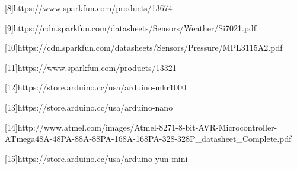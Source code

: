 \documentclass[IEEEtran,letterpaper,10pt,titlepage,fleqn,draftclsnofoot,onecolumn]{article}
\begin{document}
[8]https://www.sparkfun.com/products/13674

\vspace{1mm}

[9]https://cdn.sparkfun.com/datasheets/Sensors/Weather/Si7021.pdf

\vspace{1mm}

[10]https://cdn.sparkfun.com/datasheets/Sensors/Pressure/MPL3115A2.pdf

\vspace{1mm}

[11]https://www.sparkfun.com/products/13321

\vspace{1mm}

[12]https://store.arduino.cc/usa/arduino-mkr1000

\vspace{1mm}

[13]https://store.arduino.cc/usa/arduino-nano

\vspace{1mm}

[14]http://www.atmel.com/images/Atmel-8271-8-bit-AVR-Microcontroller-ATmega48A-48PA-88A-88PA-168A-168PA-328-328P\_datasheet\_Complete.pdf

\vspace{1mm}

[15]https://store.arduino.cc/usa/arduino-yun-mini
\end{document}
